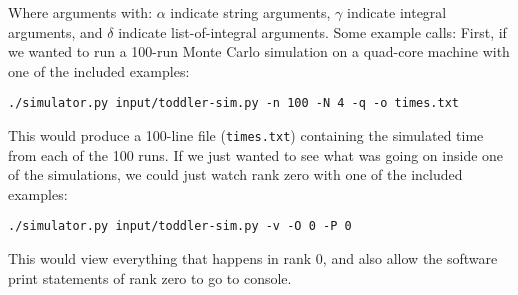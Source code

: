 \documentclass [letterpaper, 10pt, notitlepage, fleqn, oneside, 
  landscape] {article}
\begin{document}
\begin{multicols}{2}
  Where arguments with:  $\alpha$ indicate string arguments,
  $\gamma$ indicate integral arguments,
  and $\delta$ indicate list-of-integral arguments. Some example calls: First,
  if we wanted to run a 100-run Monte Carlo simulation on a quad-core machine
  with one of the included examples:

  \texttt{\quad ./simulator.py input/toddler-sim.py -n 100 -N 4 -q -o times.txt}

  This would produce a 100-line file (\texttt{times.txt}) containing the
  simulated time from each of the 100 runs. If we just wanted to see what
  was going on inside one of the simulations, we could just watch rank zero
  with one of the included examples:

  \texttt{\quad ./simulator.py input/toddler-sim.py -v -O 0 -P 0}

  This would view everything that happens in rank 0, and also allow
  the software print statements of rank zero to go to console.

\end{multicols}
\end{document}
